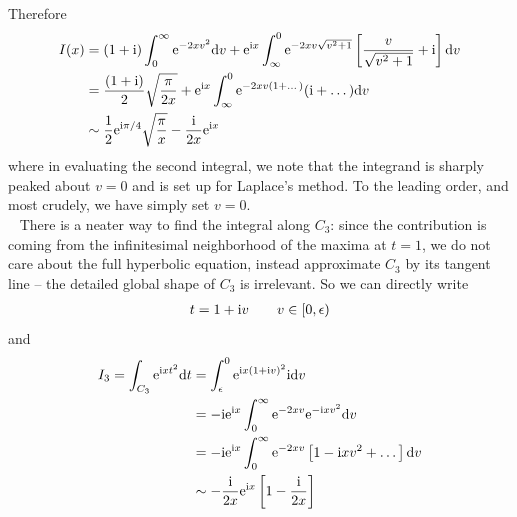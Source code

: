 Therefore
\begin{align*}
	I(x) &= (1+\mathrm{i})\int_0^\infty  \mathrm{e}^{-2xv^2} \mathrm{d} v + \mathrm{e}^{\mathrm{i} x} \int_\infty^0  \mathrm{e}^{-2x v \sqrt{v^2+1}} \left[\frac{v}{\sqrt{v^2+1}}+\mathrm{i} \right]\mathrm{d} v\\
	&= \frac{(1+\mathrm{i})}{2} \sqrt{\frac{\pi}{2x}} + \mathrm{e}^{\mathrm{i} x} \int_{\infty}^{0} \mathrm{e}^{-2xv(1+\dots) }(\mathrm{i} + \dots )\mathrm{d} v \\
	& \sim \frac{1}{2}\mathrm{e}^{\mathrm{i} \pi/4} \sqrt{\frac{\pi}{x}} - \frac{\mathrm{i} }{2x}\mathrm{e}^{\mathrm{i} x}
\end{align*}
where in evaluating the second integral, we note that the integrand is sharply peaked about $v=0$ and is set up for Laplace's method. To the leading order, and most crudely, we have simply set $v=0$. \\
\ \newline
There is a neater way to find the integral along $C_3$: since the contribution is coming from the infinitesimal neighborhood of the maxima at $t=1$, we do not care about the full hyperbolic equation, instead approximate $C_3$ by its tangent line -- the detailed global shape of $C_3$ is irrelevant. So we can directly write
\begin{gather*}
	t = 1+ \mathrm{i} v \qquad v \in [0,\epsilon)
\end{gather*}  
and
\begin{align*}
	I_3 = \int_{C_3} \mathrm{e}^{\mathrm{i} xt^2} \mathrm{d} t &= \int_{\epsilon}^{0} \mathrm{e}^{\mathrm{i} x (1+ \mathrm{i} v)^2} \mathrm{i} \mathrm{d} v \\
	&= -\mathrm{i} \mathrm{e}^{\mathrm{i} x}\int_{0}^{\infty} \mathrm{e}^{-2xv} \mathrm{e}^{-\mathrm{i} x v^2}\mathrm{d} v \\
	&= -\mathrm{i} \mathrm{e}^{\mathrm{i} x} \int_{0}^{\infty} \mathrm{e}^{-2xv} \left[1 - \mathrm{i} x v^2 + \dots\right] \mathrm{d} v \\
	& \sim -\frac{\mathrm{i} }{2x}\mathrm{e}^{\mathrm{i} x} \left[1 - \frac{\mathrm{i}}{2x}\right]
\end{align*}

  
